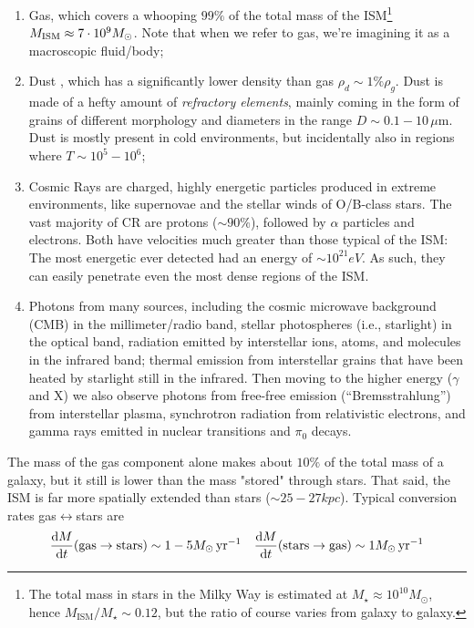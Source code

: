 \begin{enumerate}
    \item Gas, which covers a whooping $99\%$ of the total mass of the ISM\footnote{The total mass in stars in the Milky Way is estimated at $M_{\star} \approx 10^{10}M_{\odot}$, hence $M_{\text{ISM}}/M_{\star} \sim 0.12$, but the ratio of course varies from galaxy to galaxy.} $M_{\text{ISM}} \approx 7\cdot 10^{9}M_{\odot}$. Note that when we refer to gas, we're imagining it as a macroscopic fluid/body;
    \item Dust , which has a significantly lower density than gas $\rho_{d} \sim 1\% \rho_{g}$. Dust is made of a hefty amount of \emph{refractory elements}, mainly coming in the form of grains of different morphology and diameters in the range $D \sim 0.1 - 10 \,\mu\text{m}$. Dust is mostly present in cold environments, but incidentally also in regions where $T \sim 10^{5}-10^{6}$;
    \item Cosmic Rays are charged, highly energetic particles produced in extreme environments, like supernovae and the stellar winds of O/B-class stars. The vast majority of CR are protons ($\sim 90\%$), followed by $\alpha$ particles and electrons. Both have velocities much greater than those typical of the ISM: The most energetic ever detected had an energy of $\sim 10^{21}\unit{eV}$. As such, they can easily penetrate even the most dense regions of the ISM.
    \item Photons from many sources, including the cosmic microwave background (CMB) in the millimeter/radio band, stellar photospheres (i.e., starlight) in the optical band, radiation emitted by interstellar ions, atoms, and molecules in the infrared band; thermal emission from interstellar grains that have been heated by starlight still in the infrared. Then moving to the higher energy ($\gamma$ and X) we also observe photons from free-free emission (“Bremsstrahlung”) from interstellar plasma, synchrotron radiation from relativistic electrons, and gamma rays emitted in nuclear transitions and $\pi_{0}$ decays.
\end{enumerate}
The mass of the gas component alone makes about $10\%$ of the total mass of a galaxy, but it still is lower than the mass "stored" through stars. That said, the ISM is far more spatially extended than stars ($\sim 25-27\unit{kpc}$). Typical conversion rates gas$\longleftrightarrow$stars are 
\begin{equation*}
    \frac{\text{d}M}{\text{d}t}(\text{gas}\to\text{stars}) \sim 1-5M_{\odot}\,\text{yr}^{-1} \quad \frac{\text{d}M}{\text{d}t}(\text{stars}\to\text{gas}) \sim 1M_{\odot}\,\text{yr}^{-1}
\end{equation*}

